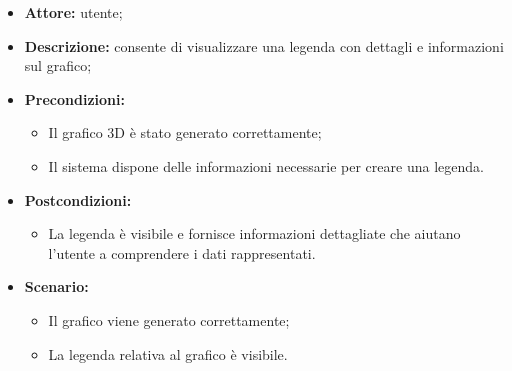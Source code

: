 \begin{itemize}
    \item \textbf{Attore:} utente;
    \item \textbf{Descrizione:} consente di visualizzare una legenda con dettagli e informazioni sul grafico;
    \item \textbf{Precondizioni:} 
    \begin{itemize}
        \item Il grafico 3D è stato generato correttamente;
        \item Il sistema dispone delle informazioni necessarie per creare una legenda.
    \end{itemize}
    \item \textbf{Postcondizioni:}
    \begin{itemize}
        \item La legenda è visibile e fornisce informazioni dettagliate che aiutano l'utente a comprendere i dati rappresentati.
    \end{itemize}
    \item \textbf{Scenario:} 
    \begin{itemize}
        \item Il grafico viene generato correttamente;
        \item La legenda relativa al grafico è visibile.
    \end{itemize}
\end{itemize}



